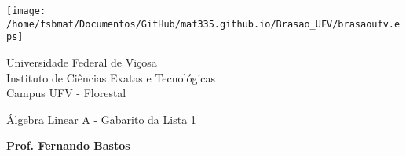 \documentclass{report}
\begin{document}
\vspace*{-2cm}

\begin{center}
\begin{minipage}[s]{2cm}
\hspace{-1.3cm}\texttt{[image: /home/fsbmat/Documentos/GitHub/maf335.github.io/Brasao\_UFV/brasaoufv.eps]}
\end{minipage}
\begin{minipage}[s]{13cm}
{\begin{center} {\sc \Large Universidade Federal de Vi\c{c}osa}\\
{\sc \large Instituto de Ci\^encias Exatas e Tecnológicas}\\
{\sc \large Campus UFV - Florestal}\\
\end{center}}
\end{minipage}\begin{minipage}[s]{2 cm}
\end{minipage}
\end{center}

\vspace{-0.3cm}



\medskip

\begin{center}

\underline{\underline{{\large{\sc Álgebra Linear A - Gabarito da Lista 1}}}}

\bigskip

{\large {\bf Prof. Fernando Bastos}}
%
\end{center}
\end{document}
